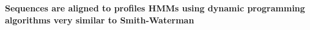 \begin{slide}
\begin{center}
\textbf{Sequences are aligned to profiles HMMs using dynamic
  programming algorithms very similar to Smith-Waterman}
\end{center}


\vfill
\end{slide}
